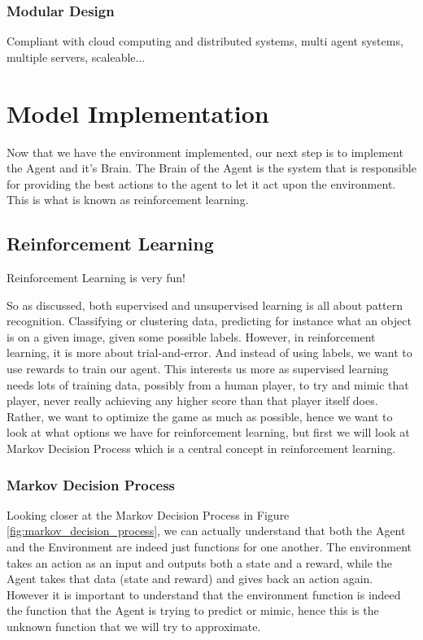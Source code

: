 \documentclass[
a4paper,
11pt,
english
]{report}
\begin{document}
\subsubsection{Modular Design}
Compliant with cloud computing and distributed systems, multi agent systems, multiple servers, scaleable...

\section{Model Implementation}
Now that we have the environment implemented, our next step is to implement the Agent and it's Brain. The Brain of the Agent is the system that is responsible for providing the best actions to the agent to let it act upon the environment. This is what is known as reinforcement learning.

\subsection{Reinforcement Learning}

Reinforcement Learning is very fun!

So as discussed, both supervised and unsupervised learning is all about pattern recognition. Classifying or clustering data, predicting for instance what an object is on a given image, given some possible labels. However, in reinforcement learning, it is more about trial-and-error. And instead of using labels, we want to use rewards to train our agent. This interests us more as supervised learning needs lots of training data, possibly from a human player, to try and mimic that player, never really achieving any higher score than that player itself does. Rather, we want to optimize the game as much as possible, hence we want to look at what options we have for reinforcement learning, but first we will look at Markov Decision Process which is a central concept in reinforcement learning.

\subsubsection{Markov Decision Process}
Looking closer at the Markov Decision Process in Figure \ref{fig:markov_decision_process}, we can actually understand that both the Agent and the Environment are indeed just functions for one another. The environment takes an action as an input and outputs both a state and a reward, while the Agent takes that data (state and reward) and gives back an action again. However it is important to understand that the environment function is indeed the function that the Agent is trying to predict or mimic, hence this is the unknown function that we will try to approximate.
\end{document}
